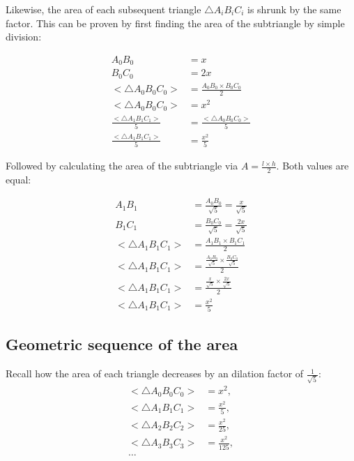\noindent
Likewise, the area of each subsequent triangle $\triangle A_{i}B_{i}C_{i}$ is shrunk by the same factor. This can be proven by first finding the area of the subtriangle by simple division:

\begin{equation}
    \begin{aligned}
        A_{0}B_{0} &= x \\
        B_{0}C_{0} &= 2x \\
        \big<\triangle A_{0}B_{0}C_{0}\big> &= \frac{A_{0}B_{0} \times B_{0}C_{0}}{2} \\
        \big<\triangle A_{0}B_{0}C_{0}\big> &= x^2 \\
        \frac{\big<\triangle A_{1}B_{1}C_{1}\big>}{5} &= \frac{\big<\triangle A_{0}B_{0}C_{0}\big>}{5} \\
        \frac{\big<\triangle A_{1}B_{1}C_{1}\big>}{5} &= \frac{x^2}{5}
    \end{aligned}
\end{equation}

\noindent
Followed by calculating the area of the subtriangle via $A = \frac{l\times h}{2}$. Both values are equal:

\begin{equation}
    \begin{aligned}
        A_{1}B_{1} &= \frac{A_{0}B_{0}}{\sqrt{5}} = \frac{x}{\sqrt{5}}\\
        B_{1}C_{1} &= \frac{B_{0}C_{0}}{\sqrt{5}} = \frac{2x}{\sqrt{5}}\\
        \big<\triangle A_{1}B_{1}C_{1}\big> &= \frac{A_{1}B_{1} \times B_{1}C_{1}}{2} \\
        \big<\triangle A_{1}B_{1}C_{1}\big> &=  \frac{\frac{A_{0}B_{0}}{\sqrt{5}} \times \frac{B_{0}C_{0}}{\sqrt{5}}}{2} \\
        \big<\triangle A_{1}B_{1}C_{1}\big> &=  \frac{\frac{x}{\sqrt{5}} \times \frac{2x}{\sqrt{5}}}{2} \\
        \big<\triangle A_{1}B_{1}C_{1}\big> &=  \frac{x^2}{5}
    \end{aligned}
\end{equation}

\subsection{Geometric sequence of the area}
Recall how the area of each triangle decreases by an dilation factor of $\frac{1}{\sqrt{5}}$:
\begin{equation}
    \begin{aligned}
        \big<\triangle A_{0}B_{0}C_{0}\big> &= x^2,\\
        \big<\triangle A_{1}B_{1}C_{1}\big> &= \frac{x^2}{5},\\
        \big<\triangle A_{2}B_{2}C_{2}\big> &= \frac{x^2}{25},\\
        \big<\triangle A_{3}B_{3}C_{3}\big> &= \frac{x^2}{125},\\
        \ldots
    \end{aligned}
\end{equation}

